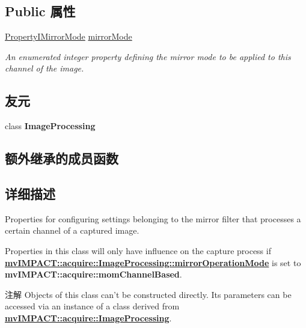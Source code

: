 \subsection*{Public 属性}
\begin{DoxyCompactItemize}
\item 
\hyperlink{group___common_interface_ga6adf15b90e84144e36bdfa8e26fb38de}{Property\+I\+Mirror\+Mode} \hyperlink{classmv_i_m_p_a_c_t_1_1acquire_1_1_mirror_parameters_a4765c2473f0ad4f59016365bfb0d746f}{mirror\+Mode}
\begin{DoxyCompactList}\small\item\em An enumerated integer property defining the mirror mode to be applied to this channel of the image. \end{DoxyCompactList}\end{DoxyCompactItemize}
\subsection*{友元}
\begin{DoxyCompactItemize}
\item 
\hypertarget{classmv_i_m_p_a_c_t_1_1acquire_1_1_mirror_parameters_aed8a20fb12bb653b1bcd24b250b8e64f}{class {\bfseries Image\+Processing}}\label{classmv_i_m_p_a_c_t_1_1acquire_1_1_mirror_parameters_aed8a20fb12bb653b1bcd24b250b8e64f}

\end{DoxyCompactItemize}
\subsection*{额外继承的成员函数}


\subsection{详细描述}
Properties for configuring settings belonging to the mirror filter that processes a certain channel of a captured image. 

Properties in this class will only have influence on the capture process if {\bfseries \hyperlink{classmv_i_m_p_a_c_t_1_1acquire_1_1_image_processing_afe70a375bdb82e907a6d420c9f40b246}{mv\+I\+M\+P\+A\+C\+T\+::acquire\+::\+Image\+Processing\+::mirror\+Operation\+Mode}} is set to {\bfseries mv\+I\+M\+P\+A\+C\+T\+::acquire\+::mom\+Channel\+Based}.

\begin{DoxyNote}{注解}
Objects of this class can't be constructed directly. Its parameters can be accessed via an instance of a class derived from {\bfseries \hyperlink{classmv_i_m_p_a_c_t_1_1acquire_1_1_image_processing}{mv\+I\+M\+P\+A\+C\+T\+::acquire\+::\+Image\+Processing}}. 
\end{DoxyNote}



